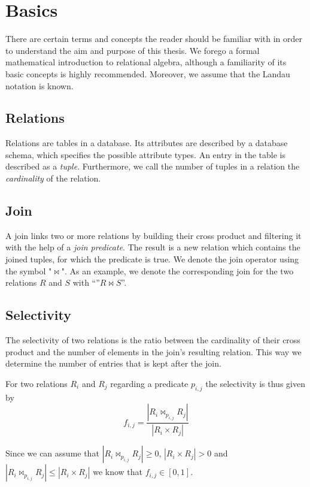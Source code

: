 \section{Basics}
\label{sec:basics}

There are certain terms and concepts the reader should be familiar with in order to understand the aim and purpose of this thesis. 
We forego a formal mathematical introduction to relational algebra, although a familiarity of its basic concepts is highly recommended. 
Moreover, we assume that the Landau notation is known.

\subsection{Relations}
Relations are tables in a database. 
Its attributes are described by a database schema, which specifies the possible attribute types.
An entry in the table is described as a \textit{tuple}. Furthermore, we call the number of tuples in a relation the \textit{cardinality} of the relation.

\subsection{Join}
A join links two or more relations by building their cross product and filtering it with the help of a \textit{join predicate}. 
The result is a new relation which contains the joined tuples, for which the predicate is true. We denote the join operator using the symbol "$\Join$". 
As an example, we denote the corresponding join for the two relations $R$ and $S$ with ``''$R \Join S$''.

\subsection{Selectivity}
The selectivity of two relations is the ratio between the cardinality of their cross product and the number of elements in the join's resulting relation. 
This way we determine the number of entries that is kept after the join.

For two relations $R_i$ and $R_j$ regarding a predicate $p_{i,j}$ the selectivity is thus given by 
\begin{equation}
f_{i,j} = \frac{|R_i\Join_{p_{i,j}}R_j|}{|R_i \times R_j|}	
\end{equation}

Since we can assume that $|R_i\Join_{p_{i,j}}R_j| \geq 0$, $|R_i \times R_j| > 0$ and $|R_i\Join_{p_{i,j}}R_j| \leq |R_i \times R_j|$ we know that $f_{i,j} \in [0,1]$.

